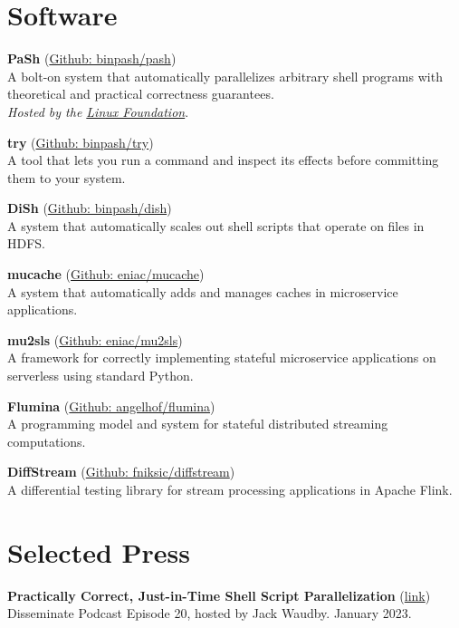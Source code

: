 \documentclass[margin]{res}
\begin{document}
\begin{resume}
\section{Software}
\hypertarget{sec:software}{}

\textbf{PaSh} (\href{https://github.com/binpash/pash}{Github: binpash/pash}) \\
A bolt-on system that automatically parallelizes arbitrary shell programs with theoretical and practical correctness guarantees. \\
{\em Hosted by the \href{https://www.linuxfoundation.org/press-release/linux-foundation-to-host-the-pash-project-accelerating-shell-scripting-with-automated-parallelization-for-industrial-use-cases/}{Linux Foundation}}.

\textbf{try} (\href{https://github.com/binpash/try}{Github: binpash/try}) \\
A tool that lets you run a command and inspect its effects before committing them to your system.

\textbf{DiSh} (\href{https://github.com/binpash/dish}{Github: binpash/dish}) \\
A system that automatically scales out shell scripts that operate on files in HDFS.

\textbf{mucache} (\href{https://github.com/eniac/mucache}{Github: eniac/mucache}) \\
A system that automatically adds and manages caches in microservice applications.

\textbf{mu2sls} (\href{https://github.com/eniac/mu2sls}{Github: eniac/mu2sls})  \\
A framework for correctly implementing stateful microservice applications on serverless using standard Python. 

\textbf{Flumina} (\href{https://github.com/angelhof/flumina}{Github: angelhof/flumina}) \\
A programming model and system for stateful distributed streaming computations.

\textbf{DiffStream} (\href{https://github.com/fniksic/diffstream}{Github: fniksic/diffstream}) \\
A differential testing library for stream processing applications in Apache Flink.

\section{Selected Press}
\hypertarget{sec:press}{}

\textbf{Practically Correct, Just-in-Time Shell Script Parallelization} (\href{https://disseminatepodcast.podcastpage.io/episode/konstantinos-kallas-practically-correct-just-in-time-shell-script-parallelization-20}{link}) \\
Disseminate Podcast Episode 20, hosted by Jack Waudby. January 2023.


\end{resume}
\end{document}
